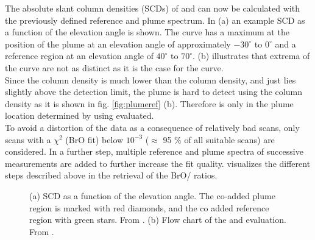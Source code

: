 The absolute slant column densities (SCDs) of   and  can now be calculated with the previously defined reference and plume spectrum.
In  (a) an example  SCD as a function of the elevation angle is shown. The  curve has a maximum at the position of the plume at an elevation angle of approximately $-30^{\circ}$ to $0^{\circ}$  and a reference region at an elevation angle of $40^{\circ}$ to $70^{\circ}$.  (b)  illustrates that  extrema of the   curve are not as distinct as it is the case for the  curve.\\
Since the  column density is much lower than the  column density, and just lies slightly above the detection limit, the plume is hard to detect using the  column density as it is shown in fig. \ref{fig:plumeref} (b). 
Therefore   is only in the plume location determined by using  evaluated.\\
To avoid a distortion of the data as a consequence of relatively bad scans, only scans with a $\chi^2$ (BrO fit) below $10^{-3}$ ($\approx$    95 \% of all suitable scans) are considered.
In a further step, multiple reference and plume spectra of successive measurements are added to further increase the fit quality.
 visualizes the different steps described above in the retrieval of the BrO/ ratios.\\
\begin{figure}
	\caption{(a)  SCD as a function of the elevation angle. The co-added plume region is marked with red diamonds, and the co added reference region with green stars. From \cite{WarnachSimon}. (b) Flow chart of the   and  evaluation. From \cite{lubcke2014optical}.}
	\label{fig:algorithm}
\end{figure}
